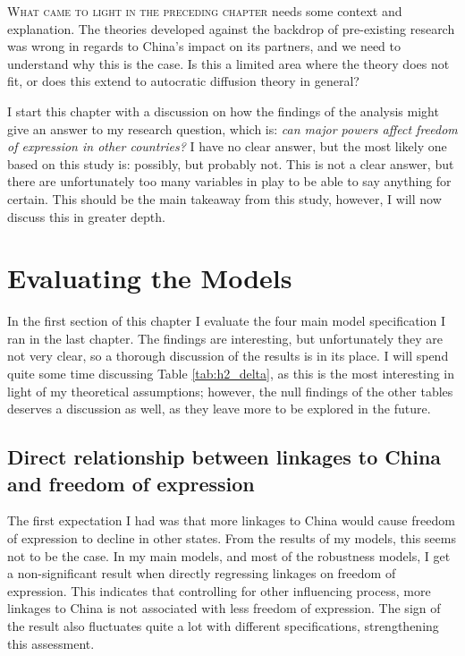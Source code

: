 \lettrine{W}{hat came to light in the preceding chapter} needs some context and explanation. The theories developed against the backdrop of pre-existing research was wrong in regards to China's impact on its partners, and we need to understand why this is the case. Is this a limited area where the theory does not fit, or does this extend to autocratic diffusion theory in general?

I start this chapter with a discussion on how the findings of the analysis might give an answer to my research question, which is: \textit{can major powers affect freedom of expression in other countries?} I have no clear answer, but the most likely one based on this study is: possibly, but probably not. This is not a clear answer, but there are unfortunately too many variables in play to be able to say anything for certain. This should be the main takeaway from this study, however, I will now discuss this in greater depth.

\section{Evaluating the Models}
In the first section of this chapter I evaluate the four main model specification I ran in the last chapter. The findings are interesting, but unfortunately they are not very clear, so a thorough discussion of the results is in its place. I will spend quite some time discussing Table \ref{tab:h2_delta}, as this is the most interesting in light of my theoretical assumptions; however, the null findings of the other tables deserves a discussion as well, as they leave more to be explored in the future.

\subsection{Direct relationship between linkages to China and freedom of expression}
The first expectation I had was that more linkages to China would cause freedom of expression to decline in other states. From the results of my models, this seems not to be the case. In my main models, and most of the robustness models, I get a non-significant result when directly regressing linkages on freedom of expression. This indicates that controlling for other influencing process, more linkages to China is not associated with less freedom of expression. The sign of the result also fluctuates quite a lot with different specifications, strengthening this assessment.

